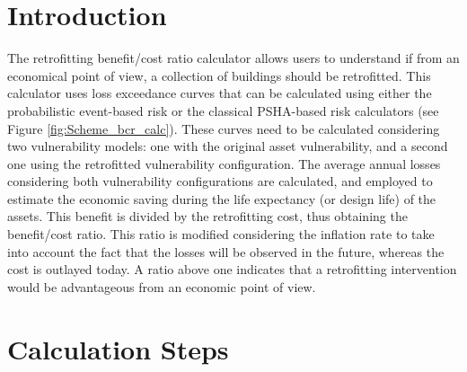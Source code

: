 \section{Introduction}

The retrofitting benefit/cost ratio calculator allows users to understand if from an economical point of view, a collection of buildings should be retrofitted. This calculator uses loss exceedance curves that can be calculated using either the probabilistic event-based risk or the classical PSHA-based risk calculators (see Figure \ref{fig:Scheme_bcr_calc}). These curves need to be calculated considering two \glspl{vulnerability model}: one with the original asset vulnerability, and a second one using the retrofitted vulnerability configuration. The average annual losses considering both vulnerability configurations are calculated, and employed to estimate the economic saving during the life expectancy (or design life) of the \glspl{asset}. This benefit is divided by the retrofitting cost, thus obtaining the benefit/cost ratio. This ratio is modified considering the inflation rate to take into account the fact that the losses will be observed in the future, whereas the cost is outlayed today. A ratio above one indicates that a retrofitting intervention would be advantageous from an economic point of view.

\section{Calculation Steps}

